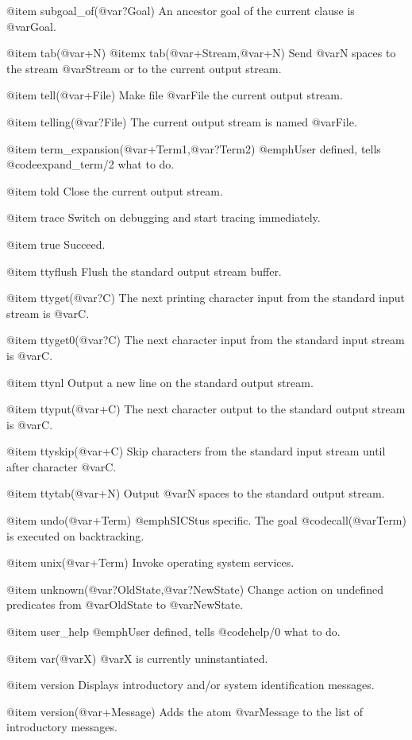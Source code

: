 {{{{{@item subgoal_of(@var{?Goal})
An ancestor goal of the current clause is @var{Goal}.

@item tab(@var{+N})
@itemx tab(@var{+Stream},@var{+N})
Send @var{N} spaces to the stream @var{Stream} or to the current output
stream.

@item tell(@var{+File})
Make file @var{File} the current output stream.

@item telling(@var{?File})
The current output stream is named @var{File}.

@item term_expansion(@var{+Term1},@var{?Term2})
@emph{User defined}, tells @code{expand_term/2} what to do.

@item told
Close the current output stream.

@item trace
Switch on debugging and start tracing immediately.

@item true
Succeed.

@item ttyflush
Flush the standard output stream buffer.

@item ttyget(@var{?C})
The next printing character input from the standard input stream is @var{C}.

@item ttyget0(@var{?C})
The next character input from the standard input stream is @var{C}.

@item ttynl
Output a new line on the standard output stream.

@item ttyput(@var{+C})
The next character output to the standard output stream is @var{C}.

@item ttyskip(@var{+C})
Skip characters from the standard input stream until after character
@var{C}.

@item ttytab(@var{+N})
Output @var{N} spaces to the standard output stream.

@item undo(@var{+Term})
@emph{SICStus specific.} The goal @code{call(@var{Term})} is executed on
backtracking.

@item unix(@var{+Term})
Invoke operating system services.

@item unknown(@var{?OldState},@var{?NewState})
Change action on undefined predicates from @var{OldState} to @var{NewState}.

@item user_help
@emph{User defined}, tells @code{help/0} what to do.

@item var(@var{X})
@var{X} is currently uninstantiated.

@item version
Displays introductory and/or system identification messages.

@item version(@var{+Message})
Adds the atom @var{Message} to the list of introductory messages.

}}}}}
